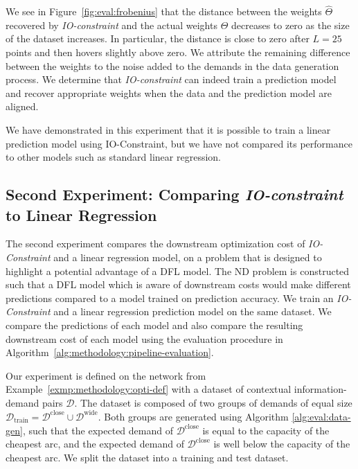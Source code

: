 We see in Figure~\ref{fig:eval:frobenius} that the distance between the weights $\hat{\Theta}$ recovered by \textit{IO-constraint} and the actual weights $\Theta$ decreases to zero as the size of the dataset increases. In particular, the distance is close to zero after $L=25$ points and then hovers slightly above zero. We attribute the remaining difference between the weights to the noise added to the demands in the data generation process. We determine that \textit{IO-constraint} can indeed train a prediction model and recover appropriate weights when the data and the prediction model are aligned.

We have demonstrated in this experiment that it is possible to train a linear prediction model using IO-Constraint, but we have not compared its performance to other models such as standard linear regression. 


\subsection{Second Experiment: Comparing \textit{IO-constraint} to Linear Regression}

The second experiment compares the downstream optimization cost of \textit{IO-Constraint} and a linear regression model, on a problem that is designed to highlight a potential advantage of a DFL model. The ND problem is constructed such that a DFL model which is aware of downstream costs would make different predictions compared to a model trained on prediction accuracy. We train an \textit{IO-Constraint} and a linear regression prediction model on the same dataset. We compare the predictions of each model and also compare the resulting downstream cost of each model using the evaluation procedure in Algorithm~\ref{alg:methodology:pipeline-evaluation}.

Our experiment is defined on the network from Example~\ref{exmp:methodology:opti-def} with a dataset of contextual information-demand pairs $\mathcal{D}$. The dataset is composed of two groups of demands of equal size $\mathcal{D}_\text{train} = \mathcal{D}^\text{close} \cup \mathcal{D}^\text{wide}$. Both groups are generated using Algorithm \ref{alg:eval:data-gen}, such that the expected demand of $\mathcal{D}^\text{close}$ is equal to the capacity of the cheapest arc, and the expected demand of $\mathcal{D}^\text{close}$ is well below the capacity of the cheapest arc. We split the dataset into a training and test dataset.

